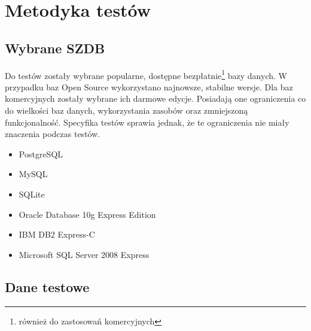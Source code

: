 \chapter{Metodyka testów}

\section{Wybrane SZDB}

Do testów zostały wybrane popularne, dostępne bezpłatnie\footnote{również do zastosowań komercyjnych} bazy danych. 
W przypadku baz Open Source wykorzystano najnowsze, stabilne wersje.
Dla baz komercyjnych zostały wybrane ich darmowe edycje. 
Posiadają one ograniczenia co do wielkości baz danych, wykorzystania zasobów oraz zmniejszoną funkcjonalność. 
Specyfika testów sprawia jednak, że te ograniczenia nie miały znaczenia podczas testów.


\begin{itemize}
 \item PostgreSQL
 \item MySQL
 \item SQLite
 \item Oracle Database 10g Express Edition
 \item IBM DB2 Express-C
 \item Microsoft SQL Server 2008 Express
\end{itemize}







% 



\section{Dane testowe}

